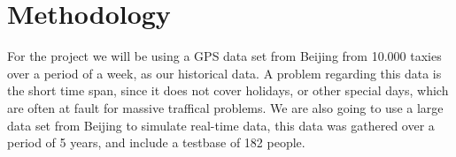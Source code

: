 \section{Methodology}
For the project we will be using a GPS data set from Beijing from 10.000 taxies over a period of a week, as our historical data\cite{TDrive}. A problem regarding this data is the short time span, since it does not cover holidays, or other special days, which are often at fault for massive traffical problems. We are also going to use a large data set from Beijing to simulate real-time data, this data was gathered over a period of 5 years, and include a testbase of 182 people\cite{Geolife}.
